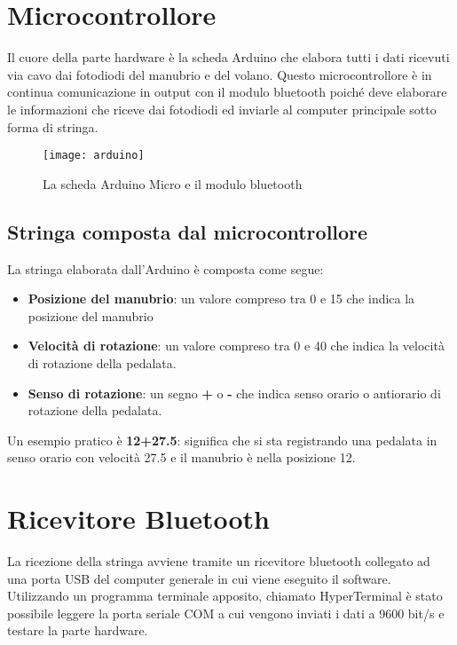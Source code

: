 \section{Microcontrollore}
\noindent Il cuore della parte hardware è la scheda Arduino che elabora tutti i dati ricevuti via cavo dai fotodiodi del manubrio e del volano. Questo microcontrollore è in continua comunicazione in output con il modulo bluetooth poiché deve elaborare le informazioni che riceve dai fotodiodi ed inviarle al computer principale sotto forma di stringa.\\
 \begin{figure}[htb]
    \centering
    \texttt{[image: arduino]}
    \caption{La scheda Arduino Micro e il modulo bluetooth\label{fig:arduino}}
\end{figure}

\subsection{Stringa composta dal microcontrollore}
\label{stringa}
La stringa elaborata dall'Arduino è composta come segue:
\begin{itemize}
  \item \textbf{Posizione del manubrio}: un valore compreso tra 0 e 15 che indica la posizione del manubrio
  \item \textbf{Velocità di rotazione}: un valore compreso tra 0 e 40 che indica la velocità di rotazione della pedalata.
  \item \textbf{Senso di rotazione}: un segno \textbf{+} o \textbf{-} che indica senso orario o antiorario di rotazione della pedalata.
\end{itemize}

\noindent Un esempio pratico è \textbf{12+27.5}: significa che si sta registrando una pedalata in senso orario con velocità 27.5 e il manubrio è nella posizione 12.

\section{Ricevitore Bluetooth}
La ricezione della stringa avviene tramite un ricevitore bluetooth collegato ad una porta USB del computer generale in cui viene eseguito il software. Utilizzando un programma terminale apposito, chiamato HyperTerminal è stato possibile leggere la porta seriale COM a cui vengono inviati i dati a 9600 bit/s e testare la parte hardware.

